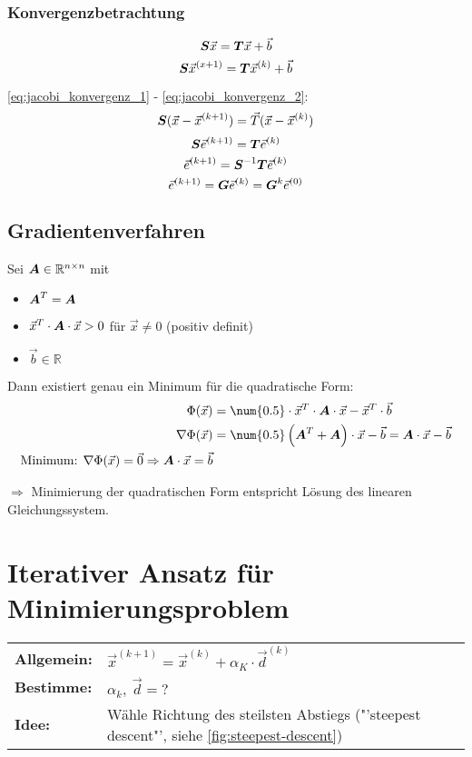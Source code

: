 \subsubsection{Konvergenzbetrachtung}
\begin{equation}
	\boldsymbol {S} \vec{x} = \boldsymbol {T} \vec{x} + \vec{b}
	\label{eq:jacobi_konvergenz_1}
\end{equation}
\begin{equation}
	\boldsymbol {S} \vec{x}^{(x + 1)} = \boldsymbol {T} \vec{x}^{(k)} + \vec{b}
	\label{eq:jacobi_konvergenz_2}
\end{equation}

\ref{eq:jacobi_konvergenz_1} - \ref{eq:jacobi_konvergenz_2}:
\[\boldsymbol {S} (\vec{x} - \vec{x}^{(k + 1)}) = \vec{T} (\vec{x} - \vec{x}^{(k)})\]
\[\boldsymbol {S} \vec{e}^{(k + 1)} = \boldsymbol {T} \vec{e}^{(k)}\]
\[\vec{e}^{(k + 1)} = \boldsymbol {S}^{-1} \boldsymbol {T} \vec{e}^{(k)}\]
\[\vec{e}^{(k + 1)} = \boldsymbol {G} \vec{e}^{(k)} = \boldsymbol {G}^k \vec{e}^{(0)}\]

\subsection{Gradientenverfahren}
Sei $ \boldsymbol {A} \in \mathbb{R}^{n\times n} $ mit
\begin{itemize}
	\item $\boldsymbol {A}^T = \boldsymbol {A}$
	\item $\vec{x}^T \cdot \boldsymbol {A} \cdot \vec{x} > 0$ für $\vec{x} \neq 0$ (positiv definit)
	\item $\vec{b} \in \mathbb{R}$
\end{itemize}

Dann existiert genau ein Minimum für die quadratische Form:
\begin{align}
	\Phi(\vec{x}) &= \num{0.5} \cdot \vec{x}^T \cdot \ma{A} \cdot \vec{x} - \vec{x}^T \cdot \vec{b}\\
	\nabla \Phi(\vec{x}) &= \num{0.5} \left( \ma{A}^T + \ma{A} \right) \cdot \vec{x} - \vec{b} = \ma{A} \cdot \vec{x} - \vec{b}\\
	\text{Minimum: } \nabla \Phi(\vec{x}) = \vec{0} \Rightarrow \ma{A} \cdot \vec{x} = \vec{b}
\end{align}

$\Rightarrow$ Minimierung der quadratischen Form entspricht Lösung des linearen Gleichungssystem.

\section{Iterativer Ansatz für Minimierungsproblem}
\begin{tabular}{ll}
	\textbf{Allgemein:} & $\vec{x}^{(k+1)} = \vec{x}^{(k)} + \alpha_K \cdot \vec{d}^{(k)}$\\
	\textbf{Bestimme:} & $\alpha_k,\ \vec{d} = ?$\\
	\textbf{Idee:} & Wähle Richtung des steilsten Abstiegs ("'steepest descent"', siehe \autoref{fig:steepest-descent})\\
\end{tabular}


